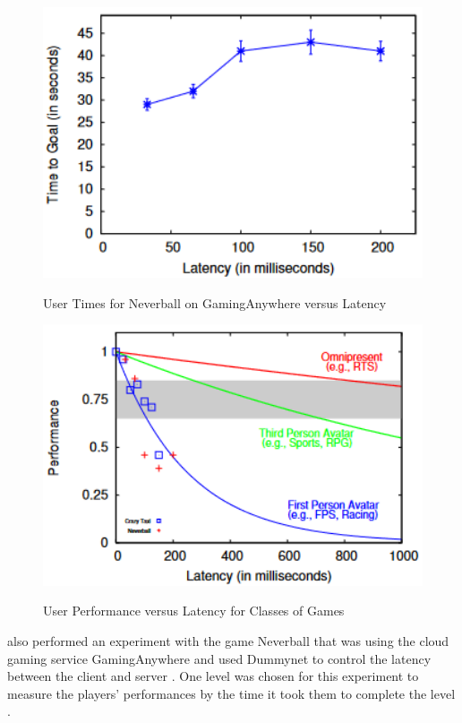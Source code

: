 \begin{figure}[H]
	\centering
	\includegraphics[width=12cm]{../img/fig23.png}
	\caption{User Times for Neverball on GamingAnywhere versus Latency}
	\parencite[Section 4, Figure 7]{claypool2014effects}
\end{figure}
\begin{figure}[H]
	\centering
	\includegraphics[width=12cm]{../img/fig24.png}
	\caption{User Performance versus Latency for Classes of Games}
	\parencite[Section 4, Figure 8]{claypool2014effects}
\end{figure}
\textcite{anouna2014network} also performed an experiment with the game Neverball that was using the cloud gaming service GamingAnywhere and used Dummynet to control the latency between the client and server \parencite[Section 3.2, Page 6]{anouna2014network}. One level was chosen for this experiment to measure the players' performances by the time it took them to complete the level \parencite[Section 4.1, Page 15]{anouna2014network}.

